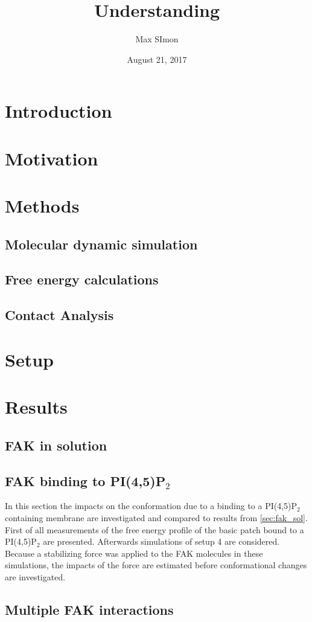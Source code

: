 \documentclass[
11pt, %
parskip=half, %
digital, %
oneside, %
]{bsc}
\title{Understanding}
\author{Max SImon}
\date{August 21, 2017}
\newcommand{\pip}{PI(4,5)P$_2$}
\begin{document}
	
\chapter{Introduction}

\chapter{Motivation}

\chapter{Methods}
\section{Molecular dynamic simulation}

\section{Free energy calculations}

\section{Contact Analysis}

\chapter{Setup}

\chapter{Results}
\section{FAK in solution}
\label{sec:fak_sol}

\section{FAK binding to \pip{}}
In this section the impacts on the conformation due to a binding to a \pip{} containing membrane are investigated and compared to results from \autoref{sec:fak_sol}.\\
First of all measurements of the free energy profile of the basic patch bound to a \pip{} are presented. Afterwards simulations of setup 4 are considered. Because a stabilizing force was applied to the FAK molecules in these simulations, the impacts of the force are estimated before conformational changes are investigated.



\section{Multiple FAK interactions}

\end{document}
